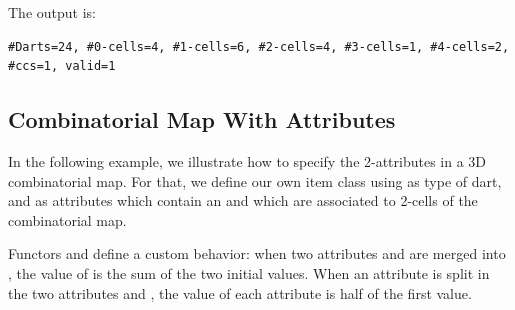 The output is:
\begin{verbatim}
#Darts=24, #0-cells=4, #1-cells=6, #2-cells=4, #3-cells=1, #4-cells=2, #ccs=1, valid=1
\end{verbatim}

\subsection{Combinatorial Map With Attributes}
\label{ssec-combi-map-with-color}
In the following example, we illustrate how to specify the
2-attributes in a 3D combinatorial map. For that, we define our own
item class using  as type of dart, and
as attributes which contain an  and which are associated to
2-cells of the combinatorial map.

Functors  and  define a
custom behavior: when two attributes  and  are
merged into , the value of  is the sum of the
two initial values.  When an attribute  is split in the two
attributes  and , the value of each attribute is
half of the first value.

